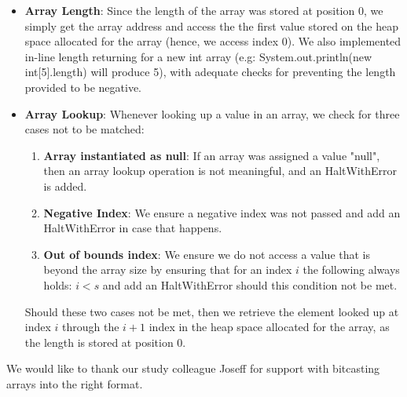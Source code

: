 \documentclass[paper=a4, fontsize=11pt]{scrartcl}
\numberwithin{equation}{section}		%
\numberwithin{figure}{section}			%
\numberwithin{table}{section}				%
\begin{document}
\begin{itemize}
\item \textbf{Array Length}: Since the length of the array was stored at position 0, we simply get the array address and access the the first value stored on the heap space allocated for the array (hence, we access index 0). We also implemented in-line length returning for a new int array  (e.g: System.out.println(new int[5].length) will produce 5), with adequate checks for preventing the length provided to be negative. 
\item \textbf{Array Lookup}: Whenever looking up a value in an array, we check for three cases not to be matched:
\begin{enumerate}
	\item \textbf{Array instantiated as null}: If an array was assigned a value "null", then an array lookup operation is not meaningful, and an HaltWithError is added. 
	\item \textbf{Negative Index}: We ensure a negative index was not passed and add an HaltWithError in case that happens. 
	\item \textbf{Out of bounds index}: We ensure we do not access a value that is beyond the array size by ensuring that for an index $i$ the following always holds: $i < s$ and add an HaltWithError should this condition not be met.
\end{enumerate}
Should these two cases not be met, then we retrieve the element looked up at index $i$ through the $i + 1$ index in the heap space allocated for the array, as the length is stored at position 0.

\end{itemize}


\begin{thebibliography}{9}%
We would like to thank our study colleague Joseff for support with bitcasting arrays into the right format.
\end{thebibliography}
\end{document}
